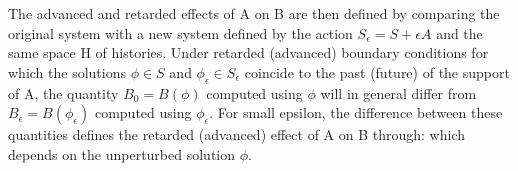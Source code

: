 \documentclass[Cascione]{subfiles}
\begin{document}
			The advanced  and retarded  effects of A on B are then defined by comparing the original system with a new system defined by the action $S_\epsilon = S + \epsilon A$ and the same space H of histories. 
			Under retarded (advanced) boundary conditions for which the solutions $\phi \in S$ and $\phi_\epsilon	\in S_\epsilon$ coincide to the past (future) of the support of A, the quantity $B_0 = B(\phi)$ computed using $\phi$ will in general differ from $B_\epsilon = B(\phi_\epsilon)$ computed using $\phi_\epsilon$.
			For small epsilon, the difference between these quantities defines the retarded (advanced) effect of A on B through:
which depends on the unperturbed solution $\phi$.
\end{document}
